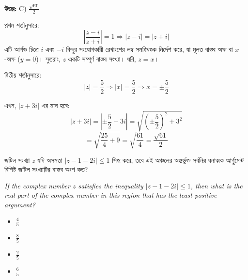 \documentclass[12pt, a4paper]{article}
\begin{document}
\vspace{0.5em}
\begin{tcolorbox}[answerbox]
    \textbf{\color{success} উত্তর:} C) $\frac{\sqrt{61}}{2}$
\end{tcolorbox}
\vspace{1em}

\begin{tcolorbox}[solutionbox={সমাধান (Solution)}]
    \noindent
    প্রথম শর্তানুসারে:
    \[ \left|\frac{z-i}{z+i}\right| = 1 \Rightarrow |z - i| = |z + i| \]
    এটি আর্গন্ড চিত্রে $i$ এবং $-i$ বিন্দুর সংযোগকারী রেখাংশের লম্ব সমদ্বিখণ্ডক নির্দেশ করে, যা মূলত বাস্তব অক্ষ বা $x$-অক্ষ ($y = 0$)। সুতরাং, $z$ একটি সম্পূর্ণ বাস্তব সংখ্যা। ধরি, $z = x$।
    
    \vspace{0.5em}
    দ্বিতীয় শর্তানুসারে:
    \[ |z| = \frac{5}{2} \Rightarrow |x| = \frac{5}{2} \Rightarrow x = \pm\frac{5}{2} \]
    
    \vspace{0.5em}
    এখন, $|z + 3i|$ এর মান হবে:
    \[ |z + 3i| = \left|\pm\frac{5}{2} + 3i\right| = \sqrt{\left(\pm\frac{5}{2}\right)^2 + 3^2} \]
    \[ = \sqrt{\frac{25}{4} + 9} = \sqrt{\frac{61}{4}} = \frac{\sqrt{61}}{2} \]
\end{tcolorbox}

\begin{tcolorbox}[questionbox={প্রশ্ন (Question) 6}]
    \noindent
    জটিল সংখ্যা $z$ যদি অসমতা $|z - 1 - 2i| \leq 1$ সিদ্ধ করে, তবে এই অঞ্চলের অন্তর্ভুক্ত সর্বনিম্ন ধনাত্মক আর্গুমেন্ট বিশিষ্ট জটিল সংখ্যাটির বাস্তব অংশ কত?
    
    \vspace{0.8em}
    \begin{english}
    \noindent\textit{\color{darkgray}
    If the complex number $z$ satisfies the inequality $|z - 1 - 2i| \leq 1$, then what is the real part of the complex number in this region that has the least positive argument?
    }
    \end{english}
\end{tcolorbox}

\begin{itemize}[label={}, leftmargin=1cm, itemsep=0.5em]
    \item[\textbf{A)}] $\frac{4}{5}$
    \item[\textbf{B)}] $\frac{8}{5}$
    \item[\textbf{C)}] $\frac{2}{5}$
    \item[\textbf{D)}] $\frac{6}{5}$
\end{itemize}
\end{document}
